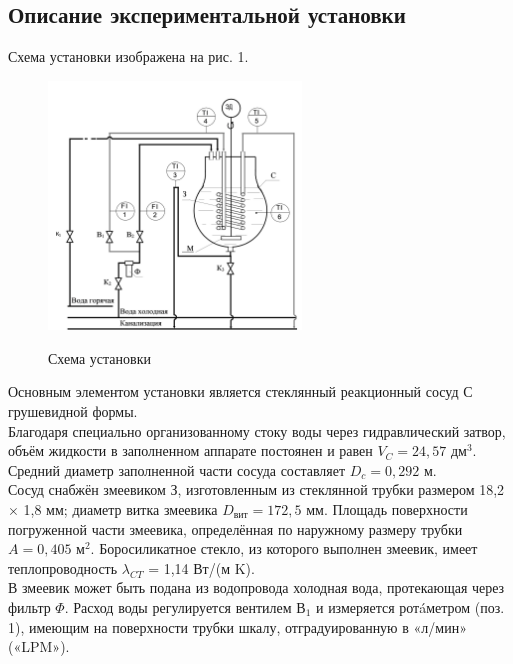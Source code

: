 \documentclass[12pt, a4paper]{article}
\begin{document}


\newpage
\begin{center}
\subsection*{Описание экспериментальной установки}
\end{center}
Схема установки изображена на рис. 1.
\begin{figure}[h]
    \centering
    \includegraphics[width=0.6\textwidth]{img/schema.png}~
    \caption{Схема установки}
\end{figure}

Основным элементом установки является стеклянный реакционный сосуд С грушевидной формы.\\

Благодаря специально организованному стоку воды через гидравлический затвор, объём жидкости в заполненном аппарате постоянен и равен $V_C = 24,57$ дм$^3$.
Средний диаметр заполненной части сосуда составляет $D_c = 0,292$ м.\\


Сосуд снабжён змеевиком З, изготовленным из стеклянной трубки размером {\diameter} 18,2 $\times$ 1,8 мм; диаметр витка змеевика $D_{\textrm{вит}} = 172,5$ мм. 
Площадь поверхности погруженной части змеевика, определённая по 
наружному размеру трубки $A = 0,405$ м$^2$. 
Боросиликатное стекло, из которого выполнен змеевик, имеет теплопроводность  ${\lambda}_{CT}$ = 1,14 Вт/(м K).\\

В змеевик может быть подана из водопровода холодная вода, протекающая через фильтр $\Phi$. Расход воды регулируется вентилем $В_1$ и измеряется ротáметром (поз. 1), имеющим на поверхности трубки шкалу, отградуированную в «л/мин» («LPM»).\\
\end{document}
